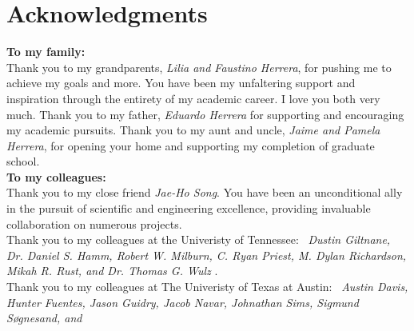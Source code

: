 \documentclass[../main.tex]{subfiles}
\begin{document}
%
    \chapter*{Acknowledgments}%
    \begin{flushleft}%
        \def\tmp{1.0ex}%
        \textbf{To my family:}\\%
        Thank you to my grandparents, \emph{Lilia and Faustino Herrera}, for pushing me to achieve my goals and more. 
        You have been my unfaltering support and inspiration through the entirety of my academic career.
        I love you both very much.
        Thank you to my father, \emph{Eduardo Herrera} for supporting and encouraging my academic pursuits.
        Thank you to my aunt and uncle, \emph{Jaime and Pamela Herrera}, for opening your home and supporting my completion of graduate school.\\%
        \vspace{\tmp}%
        \textbf{To my colleagues:}\\%
        Thank you to my close friend \emph{Jae-Ho Song}.
        You have been an unconditional ally in the pursuit of scientific and engineering excellence, providing invaluable collaboration on numerous projects.\\%
        Thank you to my colleagues at the Univeristy of Tennessee:\ %
        \emph{%
            Dustin Giltnane,
            Dr. Daniel S. Hamm,
            Robert W. Milburn,
            C. Ryan Priest,
            M. Dylan Richardson,
            Mikah R. Rust,
            and
            Dr. Thomas G. Wulz%
        }.\\%
        Thank you to my colleagues at The Univeristy of Texas at Austin:\ %
        \emph{%
            Austin Davis,            
            Hunter Fuentes,
            Jason Guidry,
            Jacob Navar,
            Johnathan Sims,
            Sigmund S{\o}gnesand,
            and
}
\end{flushleft}
\end{document}
